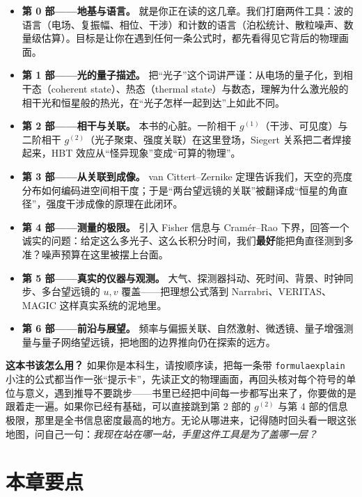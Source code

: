\begin{itemize}
  \item \textbf{第 0 部——地基与语言。} 就是你正在读的这几章。我们打磨两件工具：波的语言（电场、复振幅、相位、干涉）和计数的语言（泊松统计、散粒噪声、数量级估算）。目标是让你在遇到任何一条公式时，都先看得见它背后的物理画面。
  \item \textbf{第 1 部——光的量子描述。} 把“光子”这个词讲严谨：从电场的量子化，到相干态（coherent state）、热态（thermal state）与数态，理解为什么激光般的相干光和恒星般的热光，在“光子怎样一起到达”上如此不同。
  \item \textbf{第 2 部——相干与关联。} 本书的心脏。一阶相干 \(g^{(1)}\)（干涉、可见度）与二阶相干 \(g^{(2)}\)（光子聚束、强度关联）在这里登场，Siegert 关系把二者焊接起来，HBT 效应从“怪异现象”变成“可算的物理”。
  \item \textbf{第 3 部——从关联到成像。} van Cittert--Zernike 定理告诉我们，天空的亮度分布如何编码进空间相干度；于是“两台望远镜的关联”被翻译成“恒星的角直径”，强度干涉成像的原理在此闭环。
  \item \textbf{第 4 部——测量的极限。} 引入 Fisher 信息与 Cramér--Rao 下界，回答一个诚实的问题：给定这么多光子、这么长积分时间，我们\textbf{最好}能把角直径测到多准？噪声预算在这里被摆上台面。
  \item \textbf{第 5 部——真实的仪器与观测。} 大气、探测器抖动、死时间、背景、时钟同步、多台望远镜的 \(u,v\) 覆盖——把理想公式落到 Narrabri、VERITAS、MAGIC 这样真实系统的泥地里。
  \item \textbf{第 6 部——前沿与展望。} 频率与偏振关联、自然激射、微透镜、量子增强测量与量子网络望远镜，把地图的边界推向仍在探索的远方。
\end{itemize}

\textbf{这本书该怎么用？} 如果你是本科生，请按顺序读，把每一条带 \verb|formulaexplain| 小注的公式都当作一张“提示卡”，先读正文的物理画面，再回头核对每个符号的单位与意义，遇到推导不要跳步——书里已经把中间每一步都写出来了，你要做的是跟着走一遍。如果你已经有基础，可以直接跳到第 2 部的 \(g^{(2)}\) 与第 4 部的信息极限，那里是全书信息密度最高的地方。无论从哪进来，记得随时回头看一眼这张地图，问自己一句：\emph{我现在站在哪一站，手里这件工具是为了盖哪一层？}

\section{本章要点}
\label{sec:e00-summary}

